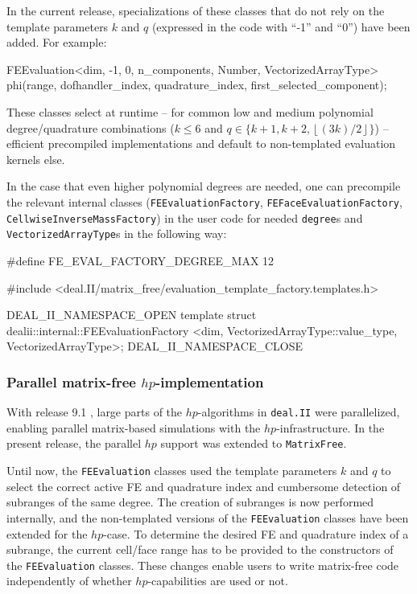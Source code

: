 \documentclass{ansarticle-preprint}
\newcommand{\specialword}[1]{\texttt{#1}}
\newcommand{\dealii}{{\specialword{deal.II}}\xspace}
\begin{document}
In the current release, specializations of these classes that do
not rely on the template parameters $k$ and $q$ (expressed in the code
with ``-1'' and ``0'') have been added. For example:
\begin{c++}
FEEvaluation<dim, -1, 0, n_components, Number, VectorizedArrayType>
  phi(range, dofhandler_index, quadrature_index, first_selected_component);
\end{c++}
These classes select at runtime -- for common low and medium
polynomial degree/quadrature combinations ($k\le 6$ and $q\in\{ k+1,
k+2, \left\lfloor (3k)/2 \right\rfloor \}$) -- efficient precompiled implementations and default to non-templated
evaluation kernels else.

In the case that even higher polynomial degrees are needed, one can precompile the
relevant internal classes
(\texttt{FEEvaluationFactory}, \texttt{FEFaceEvaluationFactory}, \texttt{CellwiseInverseMassFactory}) in the user code for needed \texttt{degree}s
and \texttt{VectorizedArrayType}s in the following way:
\begin{c++}
#define FE_EVAL_FACTORY_DEGREE_MAX 12

#include <deal.II/matrix_free/evaluation_template_factory.templates.h>

DEAL_II_NAMESPACE_OPEN
template struct dealii::internal::FEEvaluationFactory
  <dim, VectorizedArrayType::value_type, VectorizedArrayType>;
DEAL_II_NAMESPACE_CLOSE
\end{c++}


\subsubsection{Parallel matrix-free $hp$-implementation}\label{subsubsection:mf:hp}

With release 9.1 \cite{dealII91}, large parts of the $hp$-algorithms in \dealii were parallelized, enabling
parallel matrix-based simulations with the $hp$-infrastructure. In the present
release, the parallel $hp$ support was extended to \texttt{MatrixFree}.

Until now, the \texttt{FEEvaluation} classes used the template parameters $k$ and $q$ to select the correct active FE and quadrature index and cumbersome detection of subranges of the same degree.
The creation of subranges is now performed internally, and the non-templated versions
of the \texttt{FEEvaluation} classes have been extended for the $hp$-case. To determine
the desired FE and quadrature index of a subrange, the current cell/face range has to be provided
to the constructors of the \texttt{FEEvaluation} classes. These changes enable
users to write matrix-free code independently of whether $hp$-capabilities are used or not.
\end{document}

